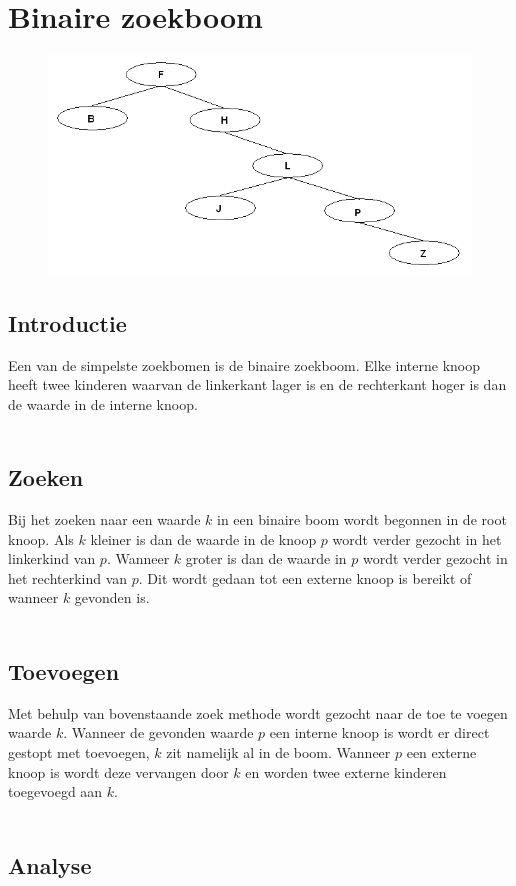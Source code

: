 \chapter{Binaire zoekboom}
\label{sec:Hoofdstuk 2}

\begin{figure}[h]
	\centering
		\includegraphics[width=\textwidth]{chap2/binarytree}
	\label{fig:binarytree}
\end{figure}

\section{Introductie}
Een van de simpelste zoekbomen is de binaire zoekboom. Elke interne knoop heeft twee kinderen waarvan de linkerkant lager is en de rechterkant hoger is dan de waarde in de interne knoop.\\
\\
\section{Zoeken}
Bij het zoeken naar een waarde $k$ in een binaire boom wordt begonnen in de root knoop. Als $k$ kleiner is dan de waarde in de knoop $p$ wordt verder gezocht in het linkerkind van $p$. Wanneer $k$ groter is dan de waarde in $p$ wordt verder gezocht in het rechterkind van $p$. Dit wordt gedaan tot een externe knoop is bereikt of wanneer $k$ gevonden is.\\
\\
\section{Toevoegen}
Met behulp van bovenstaande zoek methode wordt gezocht naar de toe te voegen waarde $k$. Wanneer de gevonden waarde $p$ een interne knoop is wordt er direct gestopt met toevoegen, $k$ zit namelijk al in de boom. Wanneer $p$ een externe knoop is wordt deze vervangen door $k$ en worden twee externe kinderen toegevoegd aan $k$.\\
\\
\section{Analyse}

